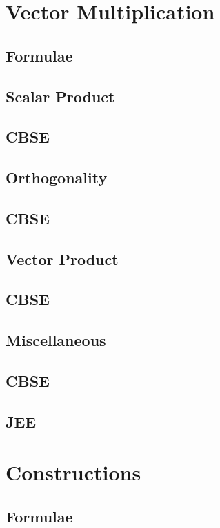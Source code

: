 \documentclass[journal]{IEEEtran}
\begin{document}
\section{Vector Multiplication}
\subsection{Formulae}

\subsection{Scalar Product}

\subsection{CBSE}

\subsection{Orthogonality}

\subsection{CBSE}

\subsection{Vector Product}

\subsection{CBSE}

\subsection{Miscellaneous}

\subsection{CBSE}

\subsection{JEE}

\newpage
\section{Constructions}
\subsection{Formulae}

\end{document}
